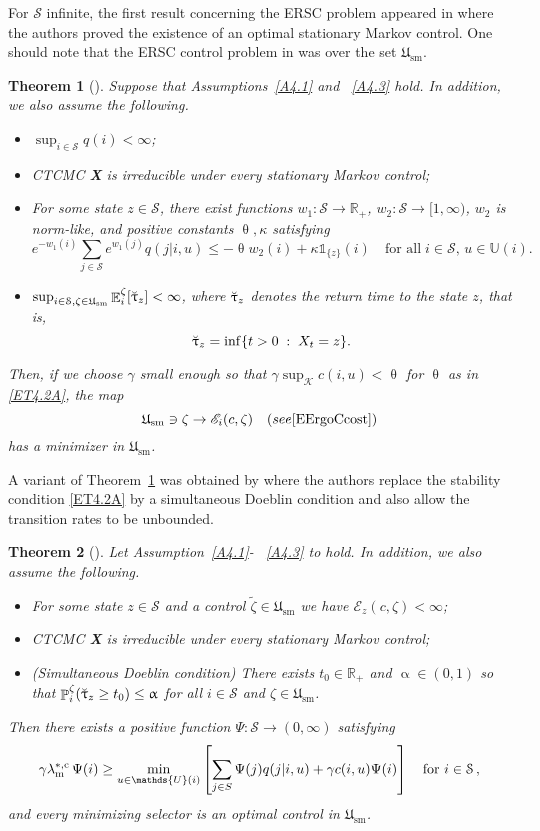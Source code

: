 \documentclass[notitlepage,11pt,reqno]{amsart}
\numberwithin{equation}{section}
\theoremstyle{plain}
\newtheorem{theorem}{Theorem}[section]
\theoremstyle{definition}
\theoremstyle{remark}
\newcommand{\Ind}{\mathds{1}}       %
\newcommand{\Act}{{\mathds{U}}}
\newcommand{\uuptau}{{\Breve{\uptau}}}
\newcommand{\sE}{{\mathscr{E}}}     %
\newcommand{\sK}{{\mathscr{K}}}
\newcommand{\cS}{{\mathcal{S}}}     %
\newcommand{\Usm}{\mathfrak{U}_{\mathrm{sm}}}
\newcommand{\RR}{\mathds{R}} %
\DeclareMathOperator{\Exp}{\mathbb{E}} %
\DeclareMathOperator{\Prob}{\mathbb{P}} %
\begin{document}
For $\cS$ infinite, the first result concerning the ERSC problem appeared in \cite{MR3230073} where the authors proved the existence of an optimal stationary Markov control.
One should note that the ERSC control problem in \cite{MR3230073} was over the set $\Usm$.
\begin{theorem}[\cite{MR3230073}]\label{T4.2}
Suppose that Assumptions~\ref{A4.1} and ~\ref{A4.3} hold. In addition, we also assume the following.
\begin{itemize}
\item[(i)] $\sup_{i\in\cS} q(i)<\infty$;
\item[(ii)] CTCMC \textbf{X} is irreducible under every stationary Markov control;
\item[(iii)] For some state $z\in\cS$, there exist functions $w_1:\cS\to\RR_+$, $w_2:\cS\to [1, \infty)$, $w_2$ is norm-like, and positive
constants $\uptheta, \kappa$ satisfying
\begin{equation}\label{ET4.2A}
e^{-w_1(i)}\sum_{j\in\cS} e^{w_1(j)} q(j|i, u)\leq -\uptheta w_2(i) + \kappa\Ind_{\{z\}}(i)\quad \text{for all}\; i\in\cS, \,  u\in \Act(i).
\end{equation}
\item[(iv)] $\sup_{i\in\cS, \zeta\in\Usm}\Exp_i^\zeta[\uuptau_z]<\infty$, where $\uuptau_z$ denotes the return time to the state $z$, that is,
$$\uuptau_z=\inf\{t>0\; :\; X_t=z\}.$$
\end{itemize}
Then, if we choose $\gamma$ small enough so that $\gamma \sup_{\sK} c(i, u)<\uptheta$ for $\uptheta$ as in \eqref{ET4.2A}, the map
$$\Usm\ni \zeta\to \sE_i(c, \zeta)\quad (see \eqref{EErgoCcost})$$
has a minimizer in $\Usm$.
\end{theorem}
A variant of Theorem~\ref{T4.2} was obtained by \cite{MR3937056} where the authors replace the stability condition \eqref{ET4.2A}
by a simultaneous Doeblin condition and
also allow the transition rates to be unbounded.
\begin{theorem}[\cite{MR3937056}]\label{T4.3}
Let Assumption~\ref{A4.1}- ~\ref{A4.3} to hold. In addition, we also
assume the following.
\begin{itemize}
\item[(i)] For some state $z\in \cS$ and a control $\tilde\zeta\in\Usm$
we have $\sE_z(c, \zeta)<\infty$;
\item[(ii)] CTCMC \textbf{X} is irreducible under every stationary Markov control;
\item[(iii)] (Simultaneous Doeblin condition) There exists $t_0\in\RR_+$ and $\upalpha\in (0,1)$
so that $\Prob^\zeta_i(\uuptau_z\geq t_0)\leq \upalpha$ for all
$i\in\cS$ and $\zeta\in\Usm$.
\end{itemize}
Then there exists a positive function 
$\Psi:\cS\to(0, \infty)$ satisfying
\begin{equation}\label{ET4.3A}
\gamma\lambda^{*, {\rm c}}_{\rm m}\, \Psi(i) \geq \min_{u\in\Act(i)}\left[\sum_{j\in S} \Psi(j)q(j|i,u) + \gamma c(i, u)\Psi(i)\right]\quad\text{for}\,\, i\in \cS\,,
\end{equation}
and every minimizing selector is an optimal control in $\Usm$.
\end{theorem}
\end{document}
